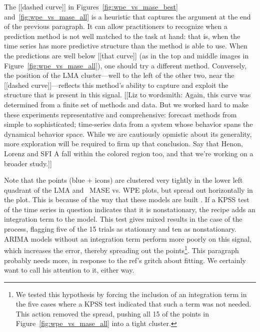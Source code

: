 The [[dashed curve]] in Figures~\ref{fig:wpe_vs_mase_best}
and~\ref{fig:wpe_vs_mase_all} is a heuristic that captures the
argument at the end of the previous paragraph.  It can allow
practitioners to recognize when a prediction method is not well
matched to the task at hand: that is, when the time series has more
predictive structure than the method is able to use.  When the
predictions are well below [[that curve]] (as in the top and middle
images in Figure~\ref{fig:wpe_vs_mase_all}), one should try a
different method.  Conversely, the position of the LMA cluster---well
to the left of the other two, near the [[dashed curve]]---reflects
this method's ability to capture and exploit the structure that is
present in this signal.  [[Liz to wordsmith: Again, this curve was
    determined from a finite set of methods and data.  But we worked
    hard to make these experiments representative and comprehensive:
    forecast methods from simple to sophisticated; time-series data
    from a system whose behavior spans the dynamical behavior space.
    While we are cautiously opmistic about its generality, more
    exploration will be required to firm up that conclusion.  Say that
    Henon, Lorenz and SFI A fall within the colored region too, and
    that we're working on a broader study.]]

Note that the \col points (blue {\color{blue}$+$} icons) are clustered
very tightly in the lower left quadrant of the LMA and \naive ~MASE
vs. WPE plots, but spread out horizontally in the \arima plot.
This is because of the way that these models are built
\cite{autoARIMA}.  If a KPSS test of the time series in question
indicates that it is nonstationary, the \arima recipe adds an
integration term to the model.  This test gives mixed results in the
case of the \col process, flagging five of the 15 trials as stationary
and ten as nonstationary.  ARIMA models without an integration term
perform more poorly on this signal, which increases the error, thereby
spreading out the points\footnote{We tested this hypothesis by forcing
  the inclusion of an integration term in the five cases where a KPSS
  test indicated that such a term was not needed.  This action removed
  the spread, pushing all 15 of the \col \arima points in
  Figure~\ref{fig:wpe_vs_mase_all} into a tight cluster.}.
\alert{This paragraph probably needs more, in response to the ref's
  gritch about fitting.  We certainly want to call his attention to
  it, either way.}


